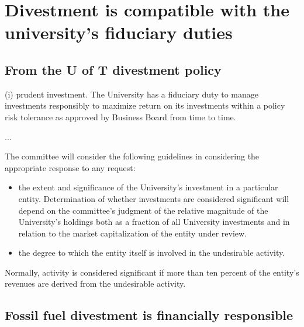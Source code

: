 


		\singlespacing
		\section {Divestment is compatible with the university's fiduciary duties}
		\label{sec:Fiduciary}
		\doublespacing
		





		\subsection {From the U of T divestment policy}
		
		
		
\begin{itquote}    
(i) prudent investment. The University has a fiduciary duty to manage investments responsibly to maximize return on its investments within a policy risk tolerance as approved by Business Board from time to time.

...

The committee will consider the following guidelines in considering the appropriate response to any request:
\begin{itemize}
  \item the extent and significance of the University's investment in a particular entity. Determination of whether investments are considered significant will depend on the committee's judgment of the relative magnitude of the University's holdings both as a fraction of all University investments and in relation to the market capitalization of the entity under review.
  \item the degree to which the entity itself is involved in the undesirable activity.
\end{itemize}
Normally, activity is considered significant if more than ten percent of the entity's revenues are derived from the undesirable activity.
\end{itquote}



	\subsection{Fossil fuel divestment is financially responsible}

